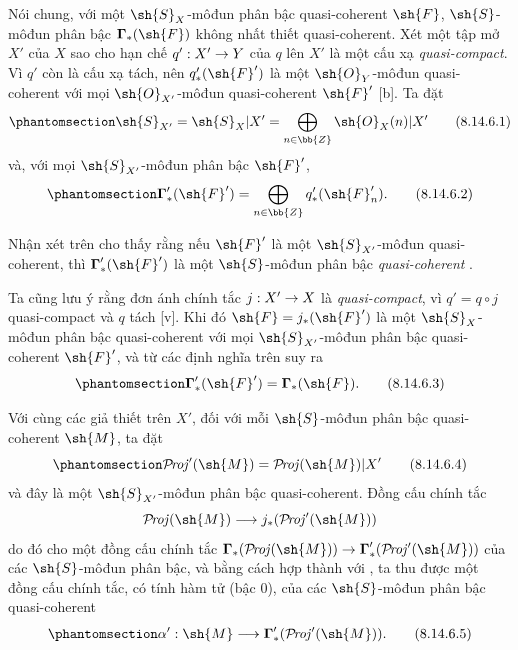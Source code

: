 \documentclass[oneside,10pt]{amsart}
\makeatletter
\newcommand{\ega@arrow}[2]{\mathchoice{#1}{#2}{#2}{#2}}
\renewcommand{\to}{\ega@arrow{\longrightarrow}{\rightarrow}}
\def\shProj{\mathcal{P}\!\mathit{roj}}
\let\EGAOriginalLabel\label
\renewcommand{\label}[1]{\phantomsection\EGAOriginalLabel{#1}}
\makeatother
\begin{document}
\begin{env}[8.14.6]
\label{II.8.14.6}
Nói chung, với một $\sh{S}_X$-môđun phân bậc quasi-coherent $\sh{F}$, $\sh{S}$-môđun phân bậc $\boldsymbol{\Gamma}_*(\sh{F})$ không nhất thiết quasi-coherent.
Xét một tập mở $X'$ của $X$ sao cho hạn chế $q':X'\to Y$ của $q$ lên $X'$ là một cấu xạ \emph{quasi-compact}.
Vì $q'$ còn là cấu xạ tách, nên $q'_*(\sh{F}')$ là một $\sh{O}_Y$-môđun quasi-coherent với mọi $\sh{O}_{X'}$-môđun quasi-coherent $\sh{F}'$ [b].
Ta đặt
\[
\label{II.8.14.6.1}
    \sh{S}_{X'} = \sh{S}_X|X' = \bigoplus_{n\in\bb{Z}}\sh{O}_X(n)|X'
\tag{8.14.6.1}
\]
và, với mọi $\sh{S}_{X'}$-môđun phân bậc $\sh{F}'$,
\[
\label{II.8.14.6.2}
    \boldsymbol{\Gamma}'_*(\sh{F}') = \bigoplus_{n\in\bb{Z}}q'_*(\sh{F}'_n).
\tag{8.14.6.2}
\]

Nhận xét trên cho thấy rằng nếu $\sh{F}'$ là một $\sh{S}_{X'}$-môđun quasi-coherent, thì $\boldsymbol{\Gamma}'_*(\sh{F}')$ là một $\sh{S}$-môđun phân bậc \emph{quasi-coherent} .

Ta cũng lưu ý rằng đơn ánh chính tắc $j:X'\to X$ là \emph{quasi-compact}, vì $q'=q\circ j$ quasi-compact và $q$ tách [v].
Khi đó $\sh{F}=j_*(\sh{F}')$ là một $\sh{S}_X$-môđun phân bậc quasi-coherent với mọi $\sh{S}_{X'}$-môđun phân bậc quasi-coherent $\sh{F}'$, và từ các định nghĩa trên suy ra
\[
\label{II.8.14.6.3}
    \boldsymbol{\Gamma}'_*(\sh{F}') = \boldsymbol{\Gamma}_*(\sh{F}).
\tag{8.14.6.3}
\]

Với cùng các giả thiết trên $X'$, đối với mỗi $\sh{S}$-môđun phân bậc quasi-coherent $\sh{M}$, ta đặt
\[
\label{II.8.14.6.4}
    \shProj'(\sh{M}) = \shProj(\sh{M})|X'
\tag{8.14.6.4}
\]
và đây là một $\sh{S}_{X'}$-môđun phân bậc quasi-coherent.
Đồng cấu chính tắc
\[
    \shProj(\sh{M}) \to j_*(\shProj'(\sh{M}))
\]
 do đó cho một đồng cấu chính tắc $\boldsymbol{\Gamma}_*(\shProj(\sh{M}))\to\boldsymbol{\Gamma}'_*(\shProj'(\sh{M}))$ của các $\sh{S}$-môđun phân bậc, và bằng cách hợp thành với , ta thu được một đồng cấu chính tắc, có tính hàm tử (bậc $0$), của các $\sh{S}$-môđun phân bậc quasi-coherent
\[
\label{II.8.14.6.5}
    \alpha': \sh{M} \to \boldsymbol{\Gamma}'_*(\shProj'(\sh{M})).
\tag{8.14.6.5}
\]
\end{env}
\end{document}

